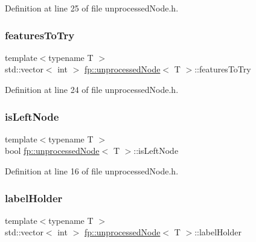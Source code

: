 Definition at line 25 of file unprocessed\+Node.\+h.

\mbox{\label{classfp_1_1unprocessedNode_ab625569c5339dfbe93b487765f530313}} 
\subsubsection{\texorpdfstring{features\+To\+Try}{featuresToTry}}
{\footnotesize\ttfamily template$<$typename T $>$ \\
std\+::vector$<$ int $>$ \hyperlink{classfp_1_1unprocessedNode}{fp\+::unprocessed\+Node}$<$ T $>$\+::features\+To\+Try\hspace{0.3cm}{\ttfamily [protected]}}



Definition at line 24 of file unprocessed\+Node.\+h.

\mbox{\label{classfp_1_1unprocessedNode_a81b74c36ed1ac15d367e135e2fa0ba3d}} 
\subsubsection{\texorpdfstring{is\+Left\+Node}{isLeftNode}}
{\footnotesize\ttfamily template$<$typename T $>$ \\
bool \hyperlink{classfp_1_1unprocessedNode}{fp\+::unprocessed\+Node}$<$ T $>$\+::is\+Left\+Node\hspace{0.3cm}{\ttfamily [protected]}}



Definition at line 16 of file unprocessed\+Node.\+h.

\mbox{\label{classfp_1_1unprocessedNode_a2aa2f9dcba0b0a859457ed22e147f698}} 
\subsubsection{\texorpdfstring{label\+Holder}{labelHolder}}
{\footnotesize\ttfamily template$<$typename T $>$ \\
std\+::vector$<$ int $>$ \hyperlink{classfp_1_1unprocessedNode}{fp\+::unprocessed\+Node}$<$ T $>$\+::label\+Holder\hspace{0.3cm}{\ttfamily [protected]}}



